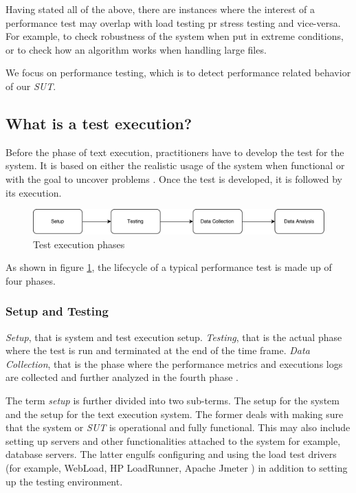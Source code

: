 Having stated all of the above, there are instances where the interest of a performance test may overlap with load testing pr stress testing and vice-versa. For example, to check robustness of the system when put in extreme conditions, or to check how an algorithm works when handling large files. 

We focus on performance testing, which is to detect performance related behavior of our \textit{SUT}.

\subsection{What is a test execution?}



Before the phase of text execution, practitioners have to develop the test for the system. It is based on either the realistic usage of the system when functional or with the goal to uncover problems \cite{jiang2015survey}.
Once the test is developed, it is followed by its execution. 

\begin{figure}[thb!]
	\centering
	\includegraphics[width=1\textwidth]{figures/bck1.pdf}
	\caption{Test execution phases}
	\label{fig:test_phases}
\end{figure}

As shown in figure \ref{fig:test_phases}, the lifecycle of a typical performance test is made up of four phases. 

\subsubsection{Setup and Testing}

\textit{Setup}, that is system and test execution setup. \textit{Testing}, that is the actual phase where the test is run and terminated at the end of the time frame. \textit{Data Collection}, that is the phase where the performance metrics and executions logs are collected and further analyzed in the fourth phase \cite{jiang2015survey}.

The term \textit{setup} is further divided into two sub-terms. The setup for the system and the setup for the text execution system. The former deals with making sure that the system or \textit{SUT} is operational and fully functional. This may also include setting up servers and other functionalities attached to the system for example, database servers. The latter engulfs configuring and using the load test drivers (for example, WebLoad\cite{webload}, HP LoadRunner\cite{loadrunner}, Apache Jmeter \cite{apachejmeter}) in addition to setting up the testing environment.

